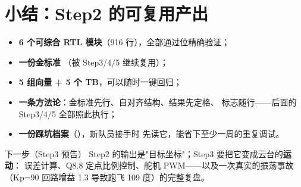 \section{小结：Step2 的可复用产出}

\begin{itemize}
  \item \textbf{6 个可综合 RTL 模块}（916 行），全部通过位精确验证；
  \item \textbf{一份金标准} （被 Step3/4/5 继续复用）；
  \item \textbf{5 组向量 + 5 个 TB}，可以随时一键回归；
  \item \textbf{一条方法论}：金标准先行、自对齐结构、结果先定格、
    标志随行——后面的 Step3/4/5 全部照此执行；
  \item \textbf{一份踩坑档案}（），新队员接手时
    先读它，能省下至少一周的重复调试。
\end{itemize}

\begin{okbox}{下一步（Step3 预告）}
Step2 的输出是"目标坐标"；Step3 要把它变成云台的\textbf{运动}：
误差计算、Q8.8 定点比例控制、舵机 PWM——以及一次真实的振荡事故
（Kp=90 回路增益 1.3 导致跑飞 109 度）的完整复盘。
\end{okbox}
